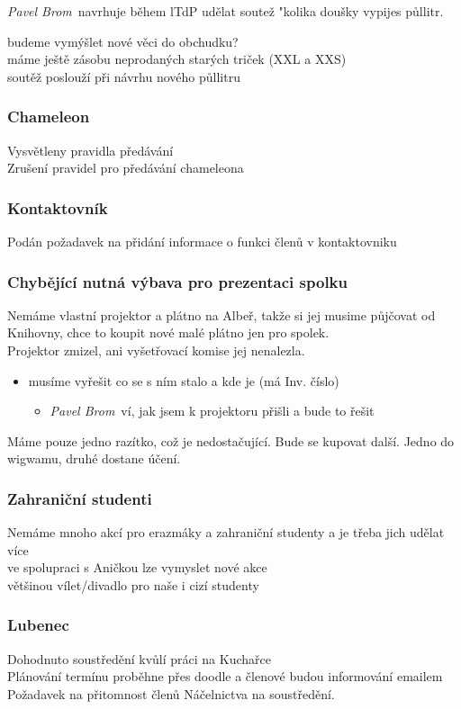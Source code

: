 \documentclass[10pt,a4paper]{report}
\newcommand{\dis}{\vskip 5mm\relax \noindent{\it\bfseries Diskuse:\/}
}
\newcommand{\pauza}{\vskip 5mm\relax}
\newcommand{\PB}{{\it Pavel Brom\/}}
\begin{document}
\PB\ navrhuje během lTdP udělat soutež "kolika doušky vypijes půllitr.\\
\dis{budeme vymýšlet nové věci do obchudku?\\
máme ještě zásobu neprodaných starých triček (XXL a XXS)\\
soutěž poslouží při návrhu nového půllitru

\subsubsection{Chameleon}
Vysvětleny pravidla předávání\\
Zrušení pravidel pro předávání chameleona

\subsubsection{Kontaktovník}
Podán požadavek na přidání informace o funkci členů v kontaktovniku

\subsubsection{Chybějící nutná výbava pro prezentaci spolku}
Nemáme vlastní projektor a plátno na Albeř, takže si jej musime půjčovat od Knihovny,
chce to koupit nové malé plátno jen pro spolek.\\
Projektor zmizel, ani vyšetřovací komise jej nenalezla.
\begin{itemize}
  \item musíme vyřešit co se s ním stalo a kde je (má Inv. číslo)
  \begin{itemize}
    \item \PB\ ví, jak jsem k projektoru přišli a bude to řešit
  \end{itemize}
\end{itemize}
Máme pouze jedno razítko, což je nedostačující. Bude se kupovat další.
Jedno do wigwamu, druhé dostane účení.

\subsubsection{Zahraniční studenti}
Nemáme mnoho akcí pro erazmáky a zahraniční studenty a je třeba jich udělat více\\
ve spolupraci s Aničkou lze vymyslet nové akce\\
většinou vílet/divadlo pro naše i cizí studenty

\subsubsection{Lubenec}
Dohodnuto soustředění kvůlí práci na Kuchařce\\
Plánování termínu proběhne přes doodle a členové budou informování emailem\\
Požadavek na přitomnost členů Náčelnictva na soustředění.
\pauza

}
\end{document}
